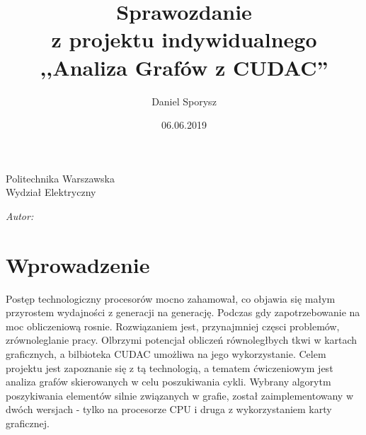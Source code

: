\documentclass[12pt]{article}
\title{Sprawozdanie\\z projektu indywidualnego\\,,Analiza Grafów z CUDAC''}
\author{Daniel Sporysz}
\date{06.06.2019}
\begin{document}
\makeatletter
\newcommand{\linia}{\rule{\linewidth}{0.4mm}}
\renewcommand{\maketitle}{\begin{titlepage}
    \begin{center}\LARGE
    Politechnika Warszawska\\Wydział Elektryczny
    \end{center}
    \vspace{4cm}
    \noindent
    \begin{center}
      \LARGE \textsc{\@title}
         \end{center}
    \vspace{4cm}
    \begin{flushright}
    \begin{minipage}{5cm}
    \textit{Autor:}\\
    \normalsize \textsc{\@author} \par
    \end{minipage}
     \end{flushright}
    \vspace*{\stretch{6}}
    \begin{center}
    \vspace*{\fill}
    \@date
    \end{center}
  \end{titlepage}%
}
\makeatother

\maketitle
\newpage

\tableofcontents
\newpage

\section{Wprowadzenie}
Postęp technologiczny procesorów mocno zahamował, co objawia się małym przyrostem wydajności z generacji na generację. Podczas gdy zapotrzebowanie na moc obliczeniową rosnie. Rozwiązaniem jest, przynajmniej częsci problemów, zrównoleglanie pracy. Olbrzymi potencjał obliczeń równoległbych tkwi w kartach graficznych, a bilbioteka CUDAC umożliwa na jego wykorzystanie.
Celem projektu jest zapoznanie się z tą technologią, a tematem ćwiczeniowym jest analiza grafów skierowanych w celu poszukiwania cykli.
Wybrany algorytm poszykiwania elementów silnie związanych w grafie, został zaimplementowany w dwóch wersjach - tylko na procesorze CPU i druga z wykorzystaniem karty graficznej.
\end{document}
